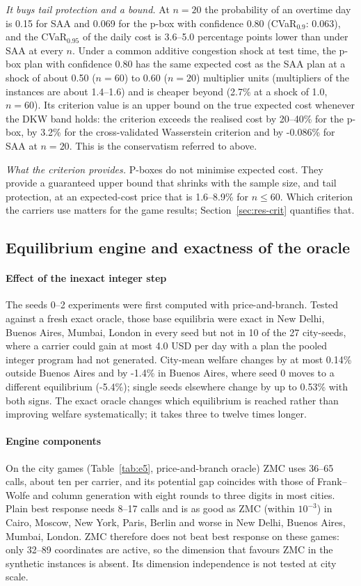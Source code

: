 \documentclass[preprint,11pt]{elsarticle}
\theoremstyle{definition}
\theoremstyle{remark}
\begin{document}
\emph{It buys tail protection and a bound.} At $n=20$ the probability of an overtime day is 0.15 for SAA and 0.069 for the p-box with confidence 0.80 (CVaR$_{0.9}$: 0.063), and the CVaR$_{0.95}$ of the daily cost is 3.6--5.0 percentage points lower than under SAA at every $n$. Under a common additive congestion shock at test time, the p-box plan with confidence 0.80 has the same expected cost as the SAA plan at a shock of about 0.50 ($n=60$) to 0.60 ($n=20$) multiplier units (multipliers of the instances are about 1.4--1.6) and is cheaper beyond (2.7\% at a shock of 1.0, $n=60$). Its criterion value is an upper bound on the true expected cost whenever the DKW band holds: the criterion exceeds the realised cost by 20--40\% for the p-box, by 3.2\% for the cross-validated Wasserstein criterion and by -0.086\% for SAA at $n=20$. This is the conservatism referred to above.

\emph{What the criterion provides.} P-boxes do not minimise expected cost. They provide a guaranteed upper bound that shrinks with the sample size, and tail protection, at an expected-cost price that is 1.6--8.9\% for $n\le60$. Which criterion the carriers use matters for the game results; Section~\ref{sec:res-crit} quantifies that.

\subsection{Equilibrium engine and exactness of the oracle}\label{sec:res-engine}

\paragraph{Effect of the inexact integer step} The seeds 0--2 experiments were first computed with price-and-branch. Tested against a fresh exact oracle, those base equilibria were exact in New Delhi, Buenos Aires, Mumbai, London in every seed but not in 10 of the 27 city-seeds, where a carrier could gain at most 4.0 USD per day with a plan the pooled integer program had not generated. City-mean welfare changes by at most 0.14\% outside Buenos Aires and by -1.4\% in Buenos Aires, where seed 0 moves to a different equilibrium (-5.4\%); single seeds elsewhere change by up to 0.53\% with both signs. The exact oracle changes which equilibrium is reached rather than improving welfare systematically; it takes three to twelve times longer.

\paragraph{Engine components} On the city games (Table~\ref{tab:e5}, price-and-branch oracle) ZMC uses 36--65 calls, about ten per carrier, and its potential gap coincides with those of Frank--Wolfe and column generation with eight rounds to three digits in most cities. Plain best response needs 8--17 calls and is as good as ZMC (within $10^{-3}$) in Cairo, Moscow, New York, Paris, Berlin and worse in New Delhi, Buenos Aires, Mumbai, London. ZMC therefore does not beat best response on these games: only 32--89 coordinates are active, so the dimension that favours ZMC in the synthetic instances is absent. Its dimension independence is not tested at city scale.
\end{document}
